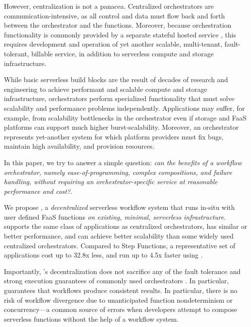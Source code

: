 However, centralization is not a panacea. Centralized orchestrators are
communication-intensive, as all control and data must flow back and forth
between the orchestrator and the functions. Moreover, because orchestration
functionality is commonly provided by a separate stateful hosted service
\cite{aws-step-functions, google-cloud-composer, google-workflows}, this
requires development and operation of yet another scalable, multi-tenant,
fault-tolerant, billable service, in addition to serverless compute and storage
infrastructure.


While basic serverless build blocks are the result of decades of research and
engineering to achieve performant and scalable compute and storage
infrastructure, orchestrators perform specialized functionality that must solve
scalability and performance problems independently. Applications may suffer, for
example, from scalability bottlenecks in the orchestrator even if storage and
FaaS platforms can support much higher burst-scalability. Moreover, an
orchestrator represents yet-another system for which platform providers must fix
bugs, maintain high availability, and provision resources.

In this paper, we try to answer a simple question: \textit{can the benefits of a
workflow  orchestrator, namely ease-of-programming, complex compositions, and
failure handling, without requiring an orchestrator-specific service at
reasonable performance and cost?}.

We propose \name{}, a \textit{decentralized} serverless workflow system that
runs in-situ with user defined FaaS functions \textit{on existing, minimal,
serverless infrastructure}. \name{} supports the same class of applications as
centralized orchestrators, has similar or better performance, and can achieve
better scalability than some widely used centralized orchestrators. Compared to
Step Functions, a representative set of applications cost up to 32.8x less, and
run up to 4.5x faster using \name{}.

Importantly, \name{}'s decentralization does not sacrifice any of the   fault
tolerance and strong execution guarantees of  commonly used orchestrators
\cite{aws-step-functions, durable-functions, google-cloud-composer,
google-workflows}.  In particular, \name{} guarantees that workflows
%
%
produce consistent results.  In particular, there is no risk of workflow
divergence due to unanticipated function nondeterminism or concurrency---a
common source of errors when developers attempt to compose serverless functions
without the help of a workflow system.

